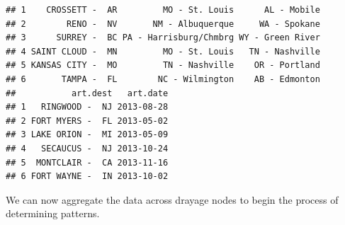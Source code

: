 \documentclass{article}\usepackage[]{graphicx}\usepackage[]{color}
\makeatletter
\newenvironment{kframe}{%
 \def\at@end@of@kframe{}%
 \ifinner\ifhmode%
  \def\at@end@of@kframe{\end{minipage}}%
  \begin{minipage}{\columnwidth}%
 \fi\fi%
 \def\FrameCommand##1{\hskip\@totalleftmargin \hskip-\fboxsep
 \colorbox{shadecolor}{##1}\hskip-\fboxsep
     \hskip-\linewidth \hskip-\@totalleftmargin \hskip\columnwidth}%
 \MakeFramed {\advance\hsize-\width
   \@totalleftmargin\z@ \linewidth\hsize
   \@setminipage}}%
 {\par\unskip\endMakeFramed%
 \at@end@of@kframe}
\newenvironment{knitrout}{}{} %
\makeatother
\begin{document}
\begin{knitrout}
\begin{kframe}
\begin{verbatim}
## 1    CROSSETT -  AR         MO - St. Louis      AL - Mobile
## 2        RENO -  NV       NM - Albuquerque     WA - Spokane
## 3      SURREY -  BC PA - Harrisburg/Chmbrg WY - Green River
## 4 SAINT CLOUD -  MN         MO - St. Louis   TN - Nashville
## 5 KANSAS CITY -  MO         TN - Nashville    OR - Portland
## 6       TAMPA -  FL        NC - Wilmington    AB - Edmonton
##           art.dest   art.date
## 1   RINGWOOD -  NJ 2013-08-28
## 2 FORT MYERS -  FL 2013-05-02
## 3 LAKE ORION -  MI 2013-05-09
## 4   SECAUCUS -  NJ 2013-10-24
## 5  MONTCLAIR -  CA 2013-11-16
## 6 FORT WAYNE -  IN 2013-10-02
\end{verbatim}
\end{kframe}
\end{knitrout}

We can now aggregate the data across drayage nodes to begin the process of determining patterns.
\end{document}
